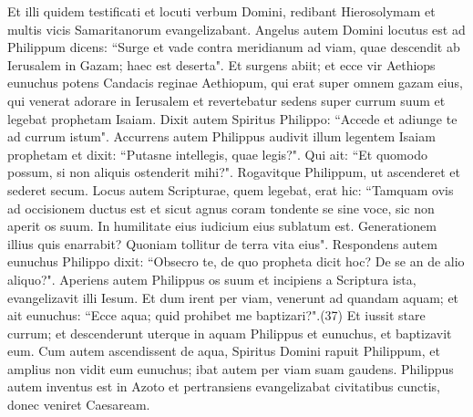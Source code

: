 \begin{biblechapter}
\verse Et illi quidem testificati et locuti verbum Domini, redibant Hierosolymam et multis vicis Samaritanorum evangelizabant. 
\verse Angelus autem Domini locutus est ad Philippum dicens: “Surge et vade contra meridianum ad viam, quae descendit ab Ierusalem in Gazam; haec est deserta".  
\verse Et surgens abiit; et ecce vir Aethiops eunuchus potens Candacis reginae Aethiopum, qui erat super omnem gazam eius, qui venerat adorare in Ierusalem  
\verse et revertebatur sedens super currum suum et legebat prophetam Isaiam. 
\verse Dixit autem Spiritus Philippo: “Accede et adiunge te ad currum istum". 
\verse Accurrens autem Philippus audivit illum legentem Isaiam prophetam et dixit: “Putasne intellegis, quae legis?". 
\verse Qui ait: “Et quomodo possum, si non aliquis ostenderit mihi?". Rogavitque Philippum, ut ascenderet et sederet secum. 
\verse Locus autem Scripturae, quem legebat, erat hic: “Tamquam ovis ad occisionem ductus est et sicut agnus coram tondente se sine voce, sic non aperit os suum. 
\verse In humilitate eius iudicium eius sublatum est. Generationem illius quis enarrabit? Quoniam tollitur de terra vita eius". 
\verse Respondens autem eunuchus Philippo dixit: “Obsecro te, de quo propheta dicit hoc? De se an de alio aliquo?". 
\verse Aperiens autem Philippus os suum et incipiens a Scriptura ista, evangelizavit illi Iesum. 
\verse Et dum irent per viam, venerunt ad quandam aquam; et ait eunuchus: “Ecce aqua; quid prohibet me baptizari?".(37) 
\verse Et iussit stare currum; et descenderunt uterque in aquam Philippus et eunuchus, et baptizavit eum. 
\verse Cum autem ascendissent de aqua, Spiritus Domini rapuit Philippum, et amplius non vidit eum eunuchus; ibat autem per viam suam gaudens. 
\verse Philippus autem inventus est in Azoto et pertransiens evangelizabat civitatibus cunctis, donec veniret Caesaream. 
\end{biblechapter}

